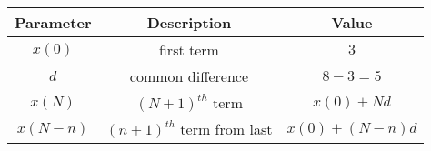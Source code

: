 \begin{tabular}{|c|c|c|}
        \hline
        \textbf{Parameter} & \textbf{Description} & \textbf{Value} \\
        \hline
        $x(0)$ & first term  & $3$ \\
         \hline
        $d$ & common difference & $8 - 3 = 5$ \\
        \hline
        $x(N)$ & $(N+1)^{th}$ term&$x(0) + Nd$\\
        \hline
        $x(N-n)$&$(n+1)^{th}$ term from last & $x(0)+(N-n)d$\\
        \hline
    \end{tabular}
